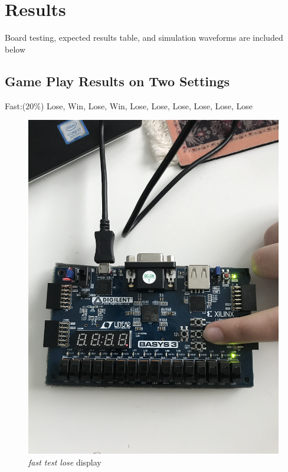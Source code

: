 \documentclass[11pt]{article}
\begin{document}
\section*{Results}
  
Board testing, expected results table, and simulation waveforms are included below
\subsection*{Game Play Results on Two Settings}
Fast:(20\%) Lose, Win, Lose, Win, Lose, Lose, Lose, Lose, Lose, Lose

\begin{figure}[ht]\centering
	\includegraphics[angle = 270, width=1\textwidth]{fast1}
	\caption{\textit{fast test lose} display}
	\label{fig:sim_with_table}
\end{figure}
\end{document}
